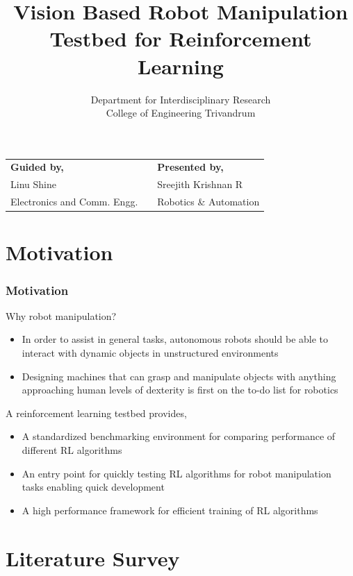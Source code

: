 \documentclass{beamer}
\title[Robotics \& Automation]{Vision Based Robot Manipulation Testbed for Reinforcement Learning}
\author[CET]{
	Department for Interdisciplinary Research\\ College of Engineering Trivandrum
}
\begin{document}
	
	\begin{frame}
		\maketitle
		
		\begin{tabularx}{\textwidth}{lXl}
			\textbf{Guided by,} & & \textbf{Presented by,} \\
			Linu Shine & & Sreejith Krishnan R \\
			Electronics and Comm. Engg. & & Robotics \& Automation
		\end{tabularx}
	\end{frame}
	
	\section{Motivation}
	
	\begin{frame}
		\frametitle{Motivation}
		Why robot manipulation?
		
		\begin{itemize}
			\item In order to assist in general tasks, autonomous robots should be able to interact with dynamic
			objects in unstructured environments
			
			\item Designing machines that can grasp and manipulate objects with anything approaching human levels of dexterity is first on the to-do list for robotics \cite{graspstate}
		\end{itemize}
		
		A reinforcement learning testbed provides,
		
		\begin{itemize}
			\item A standardized benchmarking environment for comparing performance of different RL algorithms
			\item An entry point for quickly testing RL algorithms for robot manipulation tasks enabling quick development
			\item A high performance framework for efficient training of RL algorithms
		\end{itemize}
	\end{frame}

	\section{Literature Survey}
	
\end{document}
